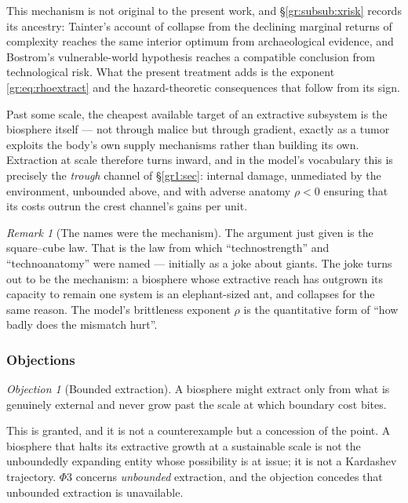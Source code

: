 \documentclass[11pt]{article}
\numberwithin{equation}{section}
\theoremstyle{plain}
\theoremstyle{definition}
\theoremstyle{remark}
\newtheorem{remark}[theorem]{Remark}
\newtheorem{objection}[theorem]{Objection}
\begin{document}
\noindent This mechanism is not original to the present work, and
\S\ref{gr:subsub:xrisk} records its ancestry: Tainter's account of
collapse from the declining marginal returns of complexity
\cite{Tainter88} reaches the same interior optimum from archaeological
evidence, and Bostrom's vulnerable-world hypothesis \cite{Bostrom19}
reaches a compatible conclusion from technological risk. What the
present treatment adds is the exponent \eqref{gr:eq:rhoextract} and the
hazard-theoretic consequences that follow from its sign.

Past some scale, the cheapest available target of an extractive
subsystem is the biosphere itself --- not through malice but through
gradient, exactly as a tumor exploits the body's own supply mechanisms
rather than building its own. Extraction at scale therefore turns
inward, and in the model's vocabulary this is precisely the
\emph{trough} channel of \S\ref{gr1:sec}: internal damage, unmediated by the
environment, unbounded above, and with adverse anatomy $\rho<0$ ensuring
that its costs outrun the crest channel's gains per unit.

\begin{remark}[The names were the mechanism]\label{gr:rem:namesclosure}
The argument just given is the square--cube law. That is the law from
which ``technostrength'' and ``technoanatomy'' were named --- initially
as a joke about giants. The joke turns out to be the mechanism: a
biosphere whose extractive reach has outgrown its capacity to remain one
system is an elephant-sized ant, and collapses for the same reason. The
model's brittleness exponent $\rho$ is the quantitative form of ``how
badly does the mismatch hurt''.
\end{remark}

\subsubsection{Objections}\label{gr:subsub:objections}

\begin{objection}[Bounded extraction]\label{gr:obj:bounded}
A biosphere might extract only from what is genuinely external and never
grow past the scale at which boundary cost bites.
\end{objection}

\noindent This is granted, and it is not a counterexample but a
concession of the point. A biosphere that halts its extractive growth at
a sustainable scale is not the unboundedly expanding entity whose
possibility is at issue; it is not a Kardashev trajectory. $\Phi3$
concerns \emph{unbounded} extraction, and the objection concedes that
unbounded extraction is unavailable.
\end{document}
